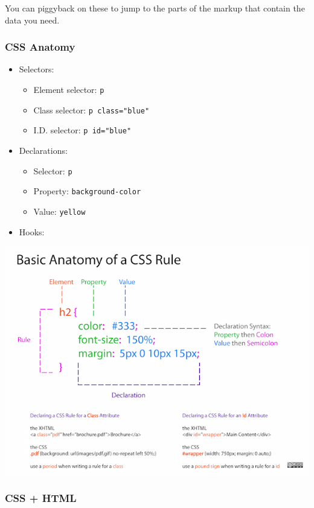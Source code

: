 \documentclass[]{book}
\providecommand{\tightlist}{%
  \setlength{\itemsep}{0pt}\setlength{\parskip}{0pt}}
\begin{document}
You can piggyback on these to jump to the parts of the markup that
contain the data you need.

\subsubsection{CSS Anatomy}\label{css-anatomy}

\begin{itemize}
\tightlist
\item
  Selectors:

  \begin{itemize}
  \tightlist
  \item
    Element selector: \texttt{p}
  \item
    Class selector: \texttt{p\ class="blue"}
  \item
    I.D. selector: \texttt{p\ id="blue"}
  \end{itemize}
\item
  Declarations:

  \begin{itemize}
  \tightlist
  \item
    Selector: \texttt{p}
  \item
    Property: \texttt{background-color}
  \item
    Value: \texttt{yellow}
  \end{itemize}
\item
  Hooks:
\end{itemize}

\begin{center}\includegraphics[width=0.7\linewidth]{img/css-rule-2} \end{center}

\subsubsection{CSS + HTML}\label{css-html}
\end{document}
